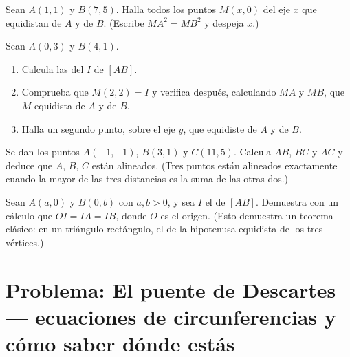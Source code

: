 \begin{exercise}[$\star\star$]\label{exo:g10:coordgeom:7}
Sean $A(1, 1)$ y $B(7, 5)$. Halla todos los puntos $M(x, 0)$ del eje $x$
que equidistan de $A$ y de $B$. (Escribe $MA^2 = MB^2$ y despeja $x$.)
\end{exercise}

\begin{exercise}[$\star\star$]\label{exo:g10:coordgeom:8}
Sean $A(0, 3)$ y $B(4, 1)$.
\begin{enumerate}
  \item Calcula las  del  $I$ de $[AB]$.
  \item Comprueba que $M(2, 2) = I$ y verifica después, calculando $MA$ y
        $MB$, que $M$ equidista de $A$ y de $B$.
  \item Halla un segundo punto, sobre el eje $y$, que equidiste de $A$ y
        de $B$.
\end{enumerate}
\end{exercise}

\begin{exercise}[$\star\star$]\label{exo:g10:coordgeom:9}
Se dan los puntos $A(-1, -1)$, $B(3, 1)$ y $C(11, 5)$. Calcula $AB$, $BC$
y $AC$ y deduce que $A$, $B$, $C$ están alineados. (Tres puntos están
alineados exactamente cuando la mayor de las tres distancias es la suma de
las otras dos.)
\end{exercise}

\begin{exercise}[$\star\star\star$]\label{exo:g10:coordgeom:10}
Sean $A(a, 0)$ y $B(0, b)$ con $a, b > 0$, y sea $I$ el  de
$[AB]$. Demuestra con un cálculo que $OI = IA = IB$, donde $O$ es el
origen. (Esto demuestra un teorema clásico: en un triángulo rectángulo, el
 de la hipotenusa equidista de los tres vértices.)
\end{exercise}

\section{Problema: El puente de Descartes --- ecuaciones de
circunferencias y cómo saber dónde estás}

